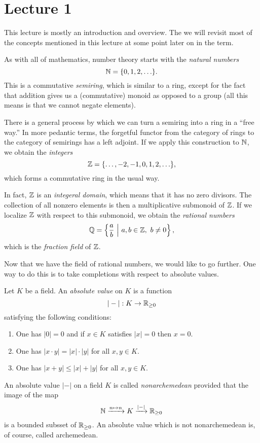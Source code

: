 \section{Lecture 1}

This lecture is mostly an introduction and overview.
The we will revisit most of the concepts mentioned in this lecture at some point later on in the term.

As with all of mathematics, number theory starts with the \emph{natural numbers}
\[ \mathbb{N} = \{0,1,2,\ldots\}. \]
This is a commutative \emph{semiring}, which is similar to a ring, except for the fact that addition gives us a (commutative) monoid as opposed to a group (all this means is that we cannot negate elements).

There is a general process by which we can turn a semiring into a ring in a ``free way.''
In more pedantic terms, the forgetful functor from the category of rings to the category of semirings has a left adjoint.
If we apply this construction to $\mathbb{N}$, we obtain the \emph{integers}
\[ \mathbb{Z} = \{\ldots,-2,-1,0,1,2,\ldots\}, \]
which forms a commutative ring in the usual way.

In fact, $\mathbb{Z}$ is an \emph{integeral domain}, which means that it has no zero divisors.
The collection of all nonzero elements is then a multiplicative submonoid of $\mathbb{Z}$.
If we localize $\mathbb{Z}$ with respect to this submonoid, we obtain the \emph{rational numbers}
\[ \mathbb{Q} = \left\{\frac{a}{b} \ \Big| \ a,b \in \mathbb{Z}, \ b \neq 0 \right\}, \]
which is the \emph{fraction field} of $\mathbb{Z}$.

Now that we have the field of rational numbers, we would like to go further.
One way to do this is to take completions with respect to absolute values.
\begin{definition}
  Let $K$ be a field.
  An \emph{absolute value} on $K$ is a function
  \[ | - | : K \to \mathbb{R}_{\geq 0} \]
  satisfying the following conditions:
  \begin{enumerate}
    \item One has $|0| = 0$ and if $x \in K$ satisfies $|x| = 0$ then $x = 0$.
    \item One has $|x \cdot y| = |x| \cdot |y|$ for all $x,y \in K$.
    \item One has $|x + y| \le |x| + |y|$ for all $x,y \in K$.
  \end{enumerate}
\end{definition}

\begin{definition}
  An absolute value $|-|$ on a field $K$ is called \emph{nonarchemedean} provided that the image of the map
  \[ \mathbb{N} \xrightarrow{n \mapsto n} K \xrightarrow{|-|} \mathbb{R}_{\geq 0} \]
  is a bounded subsset of $\mathbb{R}_{\geq 0}$.
  An absolute value which is not nonarchemedean is, of course, called archemedean.
\end{definition}

